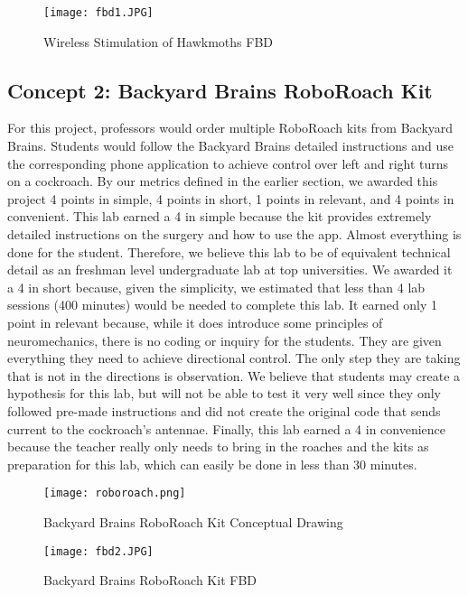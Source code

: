 \documentclass{article}
\begin{document}
\begin{figure}[ht!]
\centering
\texttt{[image: fbd1.JPG]}
\caption{Wireless Stimulation of Hawkmoths FBD}
\label{fig:FBD1}
\end{figure}

\subsection{Concept 2: Backyard Brains RoboRoach Kit}
 For this project, professors would order multiple RoboRoach kits from Backyard Brains. Students would follow the Backyard Brains detailed instructions and use the corresponding phone application to achieve control over left and right turns on a cockroach. By our metrics defined in the earlier section, we awarded this project 4 points in simple, 4 points in short, 1 points in relevant, and 4 points in convenient. This lab earned a 4 in simple because the kit provides extremely detailed instructions on the surgery and how to use the app. Almost everything is done for the student. Therefore, we believe this lab to be of equivalent technical detail as an freshman level undergraduate lab at top universities. We awarded it a 4 in short because, given the simplicity, we estimated that less than 4 lab sessions (400 minutes) would be needed to complete this lab. It earned only 1 point in relevant because, while it does introduce some principles of neuromechanics, there is no coding or inquiry for the students. They are given everything they need to achieve directional control. The only step they are taking that is not in the directions is observation. We believe that students may create a hypothesis for this lab, but will not be able to test it very well since they only followed pre-made instructions and did not create the original code that sends current to the cockroach's antennae. Finally, this lab earned a 4 in convenience because the teacher really only needs to bring in the roaches and the kits as preparation for this lab, which can easily be done in less than 30 minutes.

\begin{figure}[ht!]
\centering
\texttt{[image: roboroach.png]}
\caption{Backyard Brains RoboRoach Kit Conceptual Drawing}
\label{fig:concept2}
\end{figure}

\begin{figure}[ht!]
\centering
\texttt{[image: fbd2.JPG]}
\caption{Backyard Brains RoboRoach Kit FBD}
\label{fig:FBD2}
\end{figure}
\end{document}
